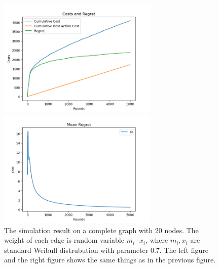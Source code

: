 \documentclass{article}
\theoremstyle{plain}
\theoremstyle{definition}
\theoremstyle{remark}
\begin{document}
    \begin{figure}[htbp!]
        \begin{minipage}[h]{0.5\linewidth}
            \centering
            \includegraphics[width=3in]{simple-cost-regret-weibull07-new.png}
        \end{minipage}
        \begin{minipage}[h]{0.5\linewidth}
            \centering
            \includegraphics[width=3in]{simple-mean-regret-weibull07-new.png}
        \end{minipage}
        \caption{The simulation result on a complete graph with 20 nodes. The weight of each edge is random variable $m_i \cdot x_i$, where $m_i,x_i$ are standard Weibull distrubution with parameter $0.7$. The left figure and the right figure shows the same things as in the previous figure.}
        \label{center-weibull07}
    \end{figure}
\end{document}
